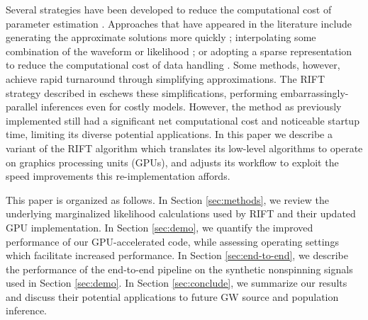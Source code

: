 \documentclass[twocolumn,prd,nofootinbib]{revtex4}
\begin{document}
Several strategies have been
developed to reduce the 
computational cost of parameter estimation \cite{gwastro-pe-Brandon-STF2,gwastro-PE-AlternativeArchitectures,gw-astro-ReducedOrderQuadraturePE-TiglioEtAl2014,2016PhRvD..94d4031S,2017CQGra..34k5006V}.  
Approaches that have appeared in the literature include
generating the approximate solutions more quickly \cite{gwastro-mergers-PE-ReducedOrder-2013,2014PhRvX...4c1006F,2013PhRvD..87l2002S,2013PhRvD..87d4008C,gwastro-mergers-IMRPhenomP,gwastro-SpinTaylorF2-2013}; 
interpolating some combination
of the waveform or likelihood \cite{gwastro-approx-ROMNR-Blackman2015,2013PhRvD..87d4008C,2013PhRvD..87l2002S,2014CQGra..31s5010P,2014PhRvD..90d4074S,gwastro-PE-AlternativeArchitectures,cole2014likelihood,2012MNRAS.421..169G};  or 
adopting a sparse representation to reduce the computational cost of data
handling \cite{antil2013two,gwastro-mergers-PE-ReducedOrder-2013,2016PhRvD..94d4031S,gw-astro-ReducedOrderQuadraturePE-TiglioEtAl2014,gwastro-PE-AlternativeArchitectures}.   %
 Some methods, however, achieve rapid turnaround through simplifying approximations.  
%
The RIFT strategy described in \cite{gwastro-PE-AlternativeArchitectures,2017CQGra..34n4002O,gwastro-PENR-RIFT,NRPaper} eschews these simplifications, performing
embarrassingly-parallel inferences even for costly models.   However, the method as previously implemented still had a
significant net  computational cost and noticeable startup time, limiting its diverse potential applications.
%
In this paper we describe a variant of the RIFT algorithm which  translates its low-level
algorithms to operate on graphics processing units (GPUs), and adjusts its workflow to exploit the speed improvements
this re-implementation affords.


This paper is organized as follows.
In Section \ref{sec:methods}, we review the underlying marginalized likelihood calculations used by RIFT and  their updated GPU
implementation.  
In Section \ref{sec:demo}, we quantify the improved performance of our  GPU-accelerated code,   while assessing
operating settings which facilitate increased performance.
In Section \ref{sec:end-to-end}, we describe the performance of the end-to-end pipeline on the synthetic nonspinning signals used in
Section \ref{sec:demo}.  
In Section \ref{sec:conclude}, we summarize our results and discuss their potential applications to future GW source and
population inference.
\end{document}
